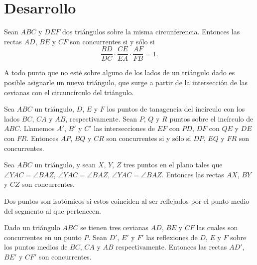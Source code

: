 \section{Desarrollo}


\begin{theorem}
    Sean $ABC$ y $DEF$ dos triángulos sobre la misma circunferencia.
    Entonces las rectas $AD$, $BE$ y $CF$ son concurrentes si y sólo si
    \[\frac{BD}{DC} \cdot \frac{CE}{EA} \cdot \frac{AF}{FB} = 1.\]
\end{theorem}

\begin{section-definition}
    A todo punto que no esté sobre alguno de los lados de un triángulo dado es posible asignarle un nuevo triángulo, que surge a partir de la intersección de las cevianas con el circuncírculo del triángulo.
\end{section-definition}

\begin{theorem}
    Sea $ABC$ un triángulo, $D$, $E$ y $F$ los puntos de tanagencia del incírculo con los lados $BC$, $CA$ y $AB$, respectivamente.
    Sean $P$, $Q$ y $R$ puntos sobre el incírculo de $ABC$.
    Llamemos $A'$, $B'$ y $C'$ las intersecciones de $EF$ con $PD$, $DF$ con $QE$ y $DE$ con $FR$.
    Entonces $AP$, $BQ$ y $CR$ son concurrentes si y sólo si $DP$, $EQ$ y $FR$ son concurrentes.
\end{theorem}

\begin{theorem}
    Sea $ABC$ un triángulo, y sean $X$, $Y$, $Z$ tres puntos en el plano tales que $\angle YAC = \angle BAZ$, $\angle YAC = \angle BAZ$, $\angle YAC = \angle BAZ$.
    Entonces las rectas $AX$, $BY$ y $CZ$ son concurrentes.
\end{theorem}

\begin{section-definition}
    Dos puntos son isotómicos si estos coinciden al ser reflejados por el punto medio del segmento al que pertenecen.
\end{section-definition}

\begin{section-definition}
    Dado un triángulo $ABC$ se tienen tres cevianas $AD$, $BE$ y $CF$ las cuales son concurrentes en un punto $P$.
    Sean $D'$, $E'$ y $F'$ las reflexiones de $D$, $E$ y $F$ sobre los puntos medios de $BC$, $CA$ y $AB$ respectivamente.
    Entonces las rectas $AD'$, $BE'$ y $CF'$ son concurrentes.
\end{section-definition}

